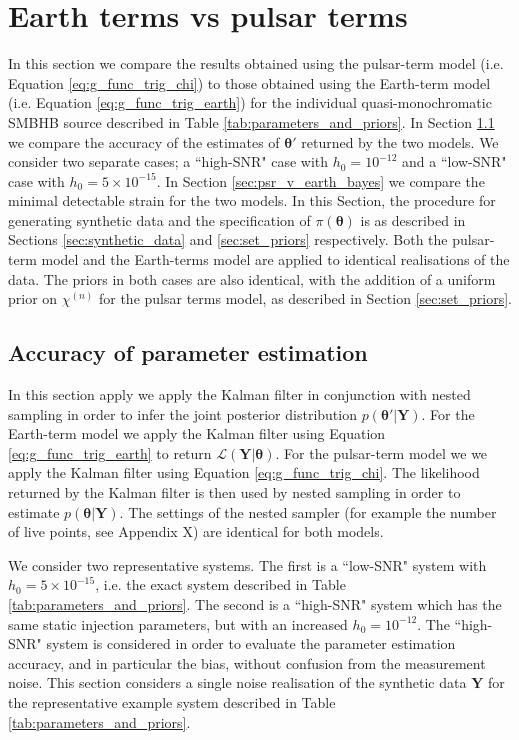 \documentclass[fleqn,usenatbib,useAMS]{mnras}
\begin{document}
\section{Earth terms vs pulsar terms}\label{sec:earth_vs_psr}
In this section we compare the results obtained using the pulsar-term model (i.e. Equation \eqref{eq:g_func_trig_chi}) to those obtained using the Earth-term model (i.e. Equation \eqref{eq:g_func_trig_earth}) for the individual quasi-monochromatic SMBHB source described in Table \ref{tab:parameters_and_priors}. In Section \ref{sec:psr_v_earth_pe} we compare the accuracy of the estimates of $\boldsymbol{\theta'}$ returned by the two models. We consider two separate cases; a ``high-SNR" case with $h_0 = 10^{-12}$ and a ``low-SNR" case with $h_0 = 5 \times 10^{-15}$. In Section \ref{sec:psr_v_earth_bayes} we compare the minimal detectable strain for the two models. In this Section, the procedure for generating synthetic data and the specification of $\pi(\boldsymbol{\theta})$ is as described in Sections \ref{sec:synthetic_data} and \ref{sec:set_priors} respectively. Both the pulsar-term model and the Earth-terms model are applied to identical realisations of the data. The priors in both cases are also identical, with the addition of a uniform prior on $\chi^{(n)}$ for the pulsar terms model, as described in Section \ref{sec:set_priors}.


\subsection{Accuracy of parameter estimation}\label{sec:psr_v_earth_pe}

In this section apply we apply the Kalman filter in conjunction with nested sampling in order to infer the joint posterior distribution $p({\boldsymbol{\theta'}} | {\boldsymbol{Y}})$. For the Earth-term model we apply the Kalman filter using Equation \eqref{eq:g_func_trig_earth} to return $\mathcal{L}(\boldsymbol{Y}| \boldsymbol{\theta})$. For the pulsar-term model we we apply the Kalman filter using Equation \eqref{eq:g_func_trig_chi}. The likelihood returned by the Kalman filter is then used by nested sampling in order to estimate $p(\boldsymbol{\theta} | \boldsymbol{Y})$. The settings of the nested sampler (for example the number of live points, see Appendix X) are identical for both models. \newline 

We consider two representative systems. The first is a ``low-SNR" system with $h_0 = 5 \times 10^{-15}$, i.e. the exact system described in Table \ref{tab:parameters_and_priors}. The second is a ``high-SNR" system which has the same static injection parameters, but with an increased $h_0 = 10^{-12}$. The ``high-SNR" system is considered in order to evaluate the parameter estimation accuracy, and in particular the bias, without confusion from the measurement noise. This section considers a single noise realisation of the synthetic data $\boldsymbol{Y}$ for the representative example system described in Table \ref{tab:parameters_and_priors}. \newline 
\end{document}
